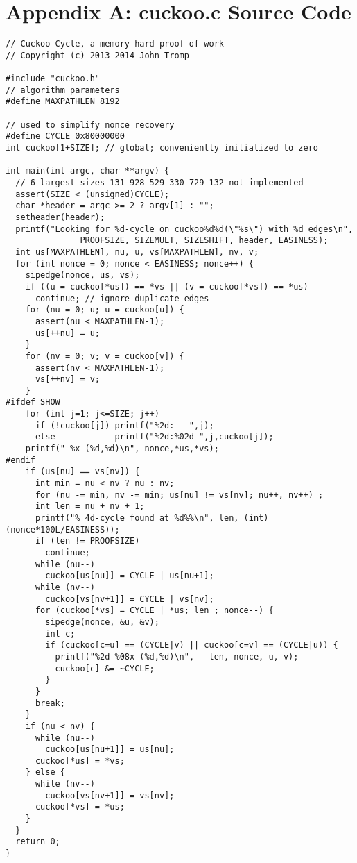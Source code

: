 \documentclass[11pt, oneside]{article}
\begin{document}



\section{Appendix A: cuckoo.c Source Code}
\footnotesize
\begin{verbatim}
// Cuckoo Cycle, a memory-hard proof-of-work
// Copyright (c) 2013-2014 John Tromp

#include "cuckoo.h"
// algorithm parameters
#define MAXPATHLEN 8192

// used to simplify nonce recovery
#define CYCLE 0x80000000
int cuckoo[1+SIZE]; // global; conveniently initialized to zero

int main(int argc, char **argv) {
  // 6 largest sizes 131 928 529 330 729 132 not implemented
  assert(SIZE < (unsigned)CYCLE);
  char *header = argc >= 2 ? argv[1] : "";
  setheader(header);
  printf("Looking for %d-cycle on cuckoo%d%d(\"%s\") with %d edges\n",
               PROOFSIZE, SIZEMULT, SIZESHIFT, header, EASINESS);
  int us[MAXPATHLEN], nu, u, vs[MAXPATHLEN], nv, v; 
  for (int nonce = 0; nonce < EASINESS; nonce++) {
    sipedge(nonce, us, vs);
    if ((u = cuckoo[*us]) == *vs || (v = cuckoo[*vs]) == *us)
      continue; // ignore duplicate edges
    for (nu = 0; u; u = cuckoo[u]) {
      assert(nu < MAXPATHLEN-1);
      us[++nu] = u;
    }
    for (nv = 0; v; v = cuckoo[v]) {
      assert(nv < MAXPATHLEN-1);
      vs[++nv] = v;
    }
#ifdef SHOW
    for (int j=1; j<=SIZE; j++)
      if (!cuckoo[j]) printf("%2d:   ",j);
      else            printf("%2d:%02d ",j,cuckoo[j]);
    printf(" %x (%d,%d)\n", nonce,*us,*vs);
#endif
    if (us[nu] == vs[nv]) {
      int min = nu < nv ? nu : nv;
      for (nu -= min, nv -= min; us[nu] != vs[nv]; nu++, nv++) ;
      int len = nu + nv + 1;
      printf("% 4d-cycle found at %d%%\n", len, (int)(nonce*100L/EASINESS));
      if (len != PROOFSIZE)
        continue;
      while (nu--)
        cuckoo[us[nu]] = CYCLE | us[nu+1];
      while (nv--)
        cuckoo[vs[nv+1]] = CYCLE | vs[nv];
      for (cuckoo[*vs] = CYCLE | *us; len ; nonce--) {
        sipedge(nonce, &u, &v);
        int c;
        if (cuckoo[c=u] == (CYCLE|v) || cuckoo[c=v] == (CYCLE|u)) {
          printf("%2d %08x (%d,%d)\n", --len, nonce, u, v);
          cuckoo[c] &= ~CYCLE;
        }
      }
      break;
    }
    if (nu < nv) {
      while (nu--)
        cuckoo[us[nu+1]] = us[nu];
      cuckoo[*us] = *vs;
    } else {
      while (nv--)
        cuckoo[vs[nv+1]] = vs[nv];
      cuckoo[*vs] = *us;
    }
  }
  return 0;
}
\end{verbatim}
\end{document}
